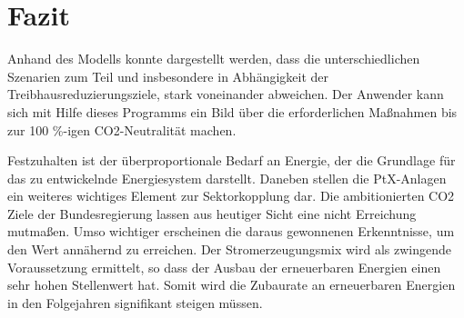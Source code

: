 \section{Fazit}
Anhand des Modells konnte dargestellt werden, dass die unterschiedlichen Szenarien zum Teil und insbesondere in Abhängigkeit der Treibhausreduzierungsziele, stark voneinander abweichen. Der Anwender kann sich mit Hilfe dieses Programms ein Bild über die erforderlichen Maßnahmen bis zur 100 \%-igen CO2-Neutralität machen. 

Festzuhalten ist der überproportionale Bedarf an Energie, der die Grundlage für das zu entwickelnde Energiesystem darstellt. Daneben stellen die PtX-Anlagen ein weiteres wichtiges Element zur Sektorkopplung dar. Die ambitionierten CO2 Ziele der Bundesregierung lassen aus heutiger Sicht eine nicht Erreichung mutmaßen. Umso wichtiger erscheinen die daraus gewonnenen Erkenntnisse, um den Wert annähernd zu erreichen. Der Stromerzeugungsmix wird als zwingende Voraussetzung ermittelt, so dass der Ausbau der erneuerbaren Energien einen sehr hohen Stellenwert hat. Somit wird die Zubaurate an erneuerbaren Energien in den Folgejahren signifikant steigen müssen.


